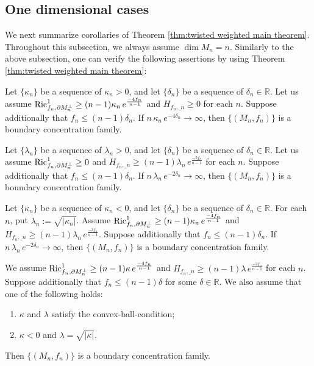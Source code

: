 \subsection{One dimensional cases}\label{sec:One dimensional cases}
We next summarize corollaries of Theorem \ref{thm:twisted weighted main theorem}.
Throughout this subsection,
we always assume $\dim M_{n}=n$.
Similarly to the above subsection,
one can verify the following assertions by using Theorem \ref{thm:twisted weighted main theorem}:

\begin{cor}
Let $\{\kappa_{n}\}$ be a sequence of $\kappa_{n}>0$,
and let $\{\delta_{n}\}$ be a sequence of $\delta_{n}\in \mathbb{R}$.
Let us assume $\operatorname{Ric}^{1}_{f_{n},\partial M_{n}^{\perp}}\geq (n-1)\kappa_{n}\,e^{\frac{-4f_{n}}{n-1}}$ and $H_{f_{n},\bm_{n}}\geq 0$ for each $n$.
Suppose additionally that
$f_{n}\leq (n-1)\delta_{n}$.
If $n\,\kappa_{n}\,e^{-4\delta_{n}}\to \infty$,
then $\{(M_{n},f_{n})\}$ is a boundary concentration family.
\end{cor}

\begin{cor}
Let $\{\lambda_{n}\}$ be a sequence of $\lambda_{n}>0$,
and let $\{\delta_{n}\}$ be a sequence of $\delta_{n}\in \mathbb{R}$.
Let us assume $\operatorname{Ric}^{1}_{f_{n},\partial M_{n}^{\perp}}\geq 0$ and $H_{f_{n},\bm_{n}}\geq (n-1)\lambda_{n}\,e^{\frac{-2f_{n}}{n-1}}$ for each $n$.
Suppose additionally that
$f_{n}\leq (n-1)\delta_{n}$.
If $n\,\lambda_{n}\,e^{-2\delta_{n}}\to \infty$,
then $\{(M_{n},f_{n})\}$ is a boundary concentration family.
\end{cor}

\begin{cor}\label{cor:one dimensional corollary}
Let $\{\kappa_{n}\}$ be a sequence of $\kappa_{n}<0$,
and let $\{\delta_{n}\}$ be a sequence of $\delta_{n}\in \mathbb{R}$.
For each $n$,
put $\lambda_{n}:=\sqrt{\vert \kappa_{n} \vert}$.
Assume $\operatorname{Ric}^{1}_{f_{n},\partial M_{n}^{\perp}}\geq (n-1)\kappa_{n}\,e^{\frac{-4f_{n}}{n-1}}$ and $H_{f_{n},\bm_{n}}\geq (n-1)\lambda_{n}\,e^{\frac{-2f_{n}}{n-1}}$.
Suppose additionally that
$f_{n}\leq (n-1)\delta_{n}$.
If $n\,\lambda_{n}\,e^{-2\delta_{n}}\to \infty$,
then $\{(M_{n},f_{n})\}$ is a boundary concentration family.
\end{cor}

\begin{cor}
We assume $\operatorname{Ric}^{1}_{f_{n},\partial M_{n}^{\perp}}\geq (n-1)\kappa\,e^{\frac{-4f_{n}}{n-1}}$ and $H_{f_{n},\bm_{n}}\geq (n-1)\lambda\,e^{\frac{-2f_{n}}{n-1}}$ for each $n$.
Suppose additionally that
$f_{n}\leq (n-1)\delta$ for some $\delta \in \mathbb{R}$.
We also assume that
one of the following holds:
\begin{enumerate}
\item $\kappa$ and $\lambda$ satisfy the convex-ball-condition;
\item $\kappa<0$ and $\lambda=\sqrt{\vert \kappa \vert}$.
\end{enumerate}
Then $\{(M_{n},f_{n})\}$ is a boundary concentration family.
\end{cor}

